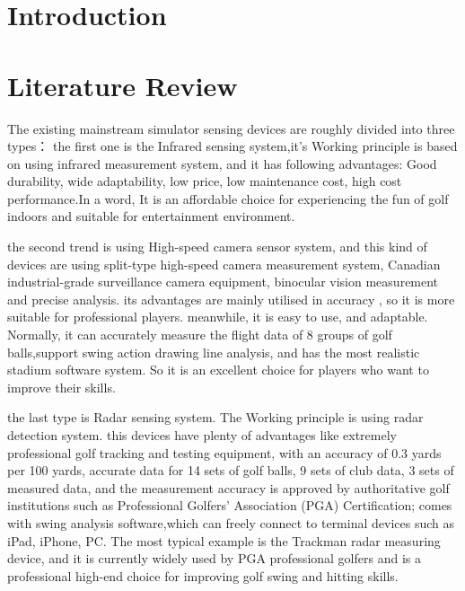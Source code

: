 \thispagestyle{empty}
\newpage

\tableofcontents{\protect\thispagestyle{empty}}
\pagestyle{fancy}
\clearpage
\setcounter{page}{1}
\newpage



\section{Introduction}



\section{Literature Review}
The existing mainstream simulator sensing devices are roughly divided into three types\textcite{tuxen2020method}：
the first one is the Infrared sensing system,it's Working principle is based on using infrared measurement system, and it has following advantages: Good durability, wide adaptability, low price, low maintenance cost, high cost performance.In a word, It is an affordable choice for experiencing the fun of golf indoors and suitable for entertainment environment.

the second trend is using High-speed camera sensor system, and this kind of devices are using split-type high-speed camera measurement system, Canadian industrial-grade surveillance camera equipment, binocular vision measurement and precise analysis.
its advantages are mainly utilised in accuracy , so it is more suitable for professional players. meanwhile, it is easy to use, and adaptable. Normally, it can accurately measure the flight data of 8 groups of golf balls,support swing action drawing line analysis, and has the most realistic stadium software system. So it is an excellent choice for players who want to improve their skills.

the last type is Radar sensing system.  The Working principle is  using radar detection system.
this devices have plenty of advantages like extremely professional golf tracking and testing equipment, \textcite{trackmangolf} with an accuracy of 0.3 yards per 100 yards, accurate data for 14 sets of golf balls, 9 sets of club data, 3 sets of measured data, and the measurement accuracy is approved by authoritative golf institutions such as Professional Golfers' Association (PGA) Certification; comes with swing analysis software,which can freely connect to terminal devices such as iPad, iPhone, PC. The most typical example is the Trackman radar measuring device, and it is currently widely used by PGA professional golfers and is a professional high-end choice for improving golf swing and hitting skills.





